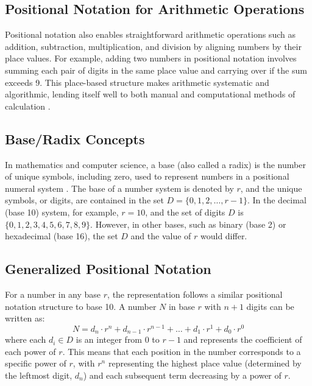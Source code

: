 \subsection{Positional Notation for Arithmetic Operations}
Positional notation also enables straightforward arithmetic operations such as addition, subtraction, multiplication, and division by aligning numbers by their place values. For example, adding two numbers in positional notation involves summing each pair of digits in the same place value and carrying over if the sum exceeds 9. This place-based structure makes arithmetic systematic and algorithmic, lending itself well to both manual and computational methods of calculation \cite{burton2010-number}.


\subsection{Base/Radix Concepts}
In mathematics and computer science, a base (also called a radix) is the number of unique symbols, including zero, used to represent numbers in a positional numeral system \cite{knuth1997,rosen2018}. The base of a number system is denoted by \( r \), and the unique symbols, or digits, are contained in the set \( D = \{0, 1, 2, \ldots, r-1\} \). In the decimal (base 10) system, for example, \( r = 10 \), and the set of digits \( D \) is \( \{0, 1, 2, 3, 4, 5, 6, 7, 8, 9\} \). However, in other bases, such as binary (base 2) or hexadecimal (base 16), the set \( D \) and the value of \( r \) would differ.

\subsection{Generalized Positional Notation}

For a number in any base \( r \), the representation follows a similar positional notation structure to base 10. A number \( N \) in base \( r \) with \( n+1 \) digits can be written as:
\[
N = d_n \cdot r^n + d_{n-1} \cdot r^{n-1} + \ldots + d_1 \cdot r^1 + d_0 \cdot r^0
\]
where each \( d_i \in D \) is an integer from \( 0 \) to \( r-1 \) and represents the coefficient of each power of \( r \). This means that each position in the number corresponds to a specific power of \( r \), with \( r^n \) representing the highest place value (determined by the leftmost digit, \( d_n \)) and each subsequent term decreasing by a power of \( r \).


